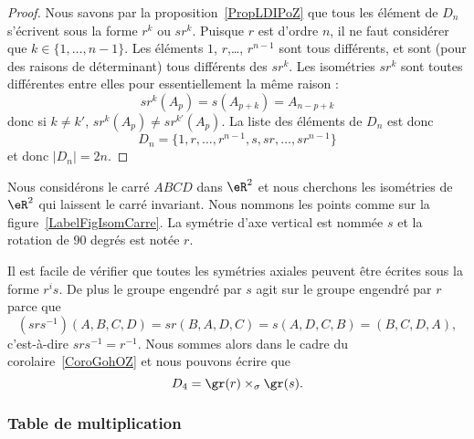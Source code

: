 \begin{proof}
	Nous savons par la proposition~\ref{PropLDIPoZ} que tous les élément de \( D_n\) s'écrivent sous la forme \( r^k\) ou \( sr^k\). Puisque \( r\) est d'ordre \( n\), il ne faut considérer que \( k\in\{ 1,\ldots, n-1 \}\). Les éléments \( 1\), \( r\),\ldots, \( r^{n-1}\) sont tous différents, et sont (pour des raisons de déterminant) tous différents des \( sr^k\). Les isométries \( sr^k\) sont toutes différentes entre elles pour essentiellement la même raison :
	\begin{equation}
		sr^k(A_p)=s(A_{p+k})=A_{n-p+k}
	\end{equation}
	donc si \( k\neq k'\), \( sr^k(A_p)\neq sr^{k'}(A_p)\). La liste des éléments de \( D_n\) est donc
	\begin{equation}
		D_n=\{ 1,r,\ldots, r^{n-1},s,sr,\ldots, sr^{n-1} \}
	\end{equation}
	et donc \( | D_n |=2n\).
\end{proof}

\begin{example}     \label{EXooHNYYooUDsKnm}
	Nous considérons le carré \( ABCD\) dans \( \eR^2\) et nous cherchons les isométries de \( \eR^2\) qui laissent le carré invariant. Nous nommons les points comme sur la figure~\ref{LabelFigIsomCarre}. La symétrie d'axe vertical est nommée \( s\) et la rotation de \( 90\) degrés est notée \( r\).
	\newcommand{\CaptionFigIsomCarre}{Le carré dont nous étudions le groupe diédral.}
	

	Il est facile de vérifier que toutes les symétries axiales peuvent être écrites sous la forme \( r^is\). De plus le groupe engendré par \( s\) agit sur le groupe engendré par \( r\) parce que
	\begin{equation}
		(srs^{-1})(A,B,C,D)=sr(B,A,D,C)=s(A,D,C,B)=(B,C,D,A),
	\end{equation}
	c'est-à-dire \( srs^{-1}=r^{-1}\). Nous sommes alors dans le cadre du corolaire~\ref{CoroGohOZ} et nous pouvons écrire que
	\begin{equation}
		D_4=\gr(r)\times_{\sigma}\gr(s).
	\end{equation}
\end{example}

\subsubsection{Table de multiplication}

